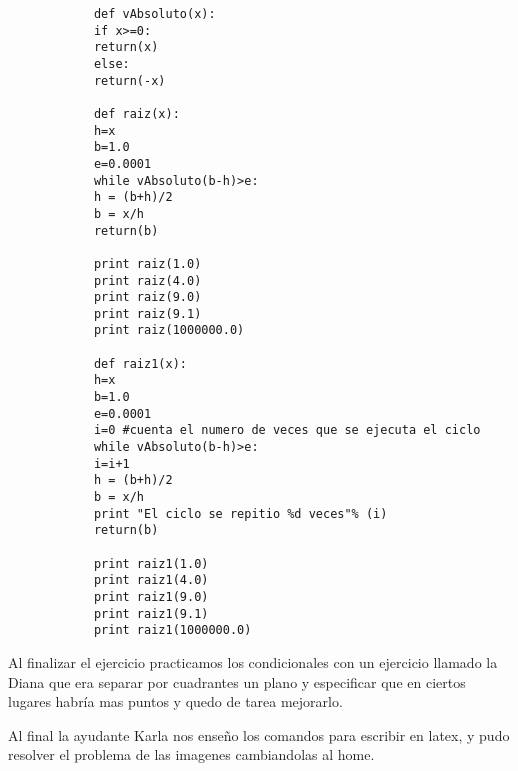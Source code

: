 \documentclass[letterpaper, 12pt, oneside]{article}
\begin{document}
\begin{enumerate}
\begin{enumerate}
			
			
			\newpage
			\begin{verbatim}
			def vAbsoluto(x):
			if x>=0:
			return(x)
			else:
			return(-x)
			
			def raiz(x):
			h=x
			b=1.0
			e=0.0001
			while vAbsoluto(b-h)>e:
			h = (b+h)/2
			b = x/h
			return(b)
			
			print raiz(1.0)
			print raiz(4.0)
			print raiz(9.0)
			print raiz(9.1)
			print raiz(1000000.0)
			
			def raiz1(x):
			h=x
			b=1.0
			e=0.0001
			i=0 #cuenta el numero de veces que se ejecuta el ciclo
			while vAbsoluto(b-h)>e:
			i=i+1
			h = (b+h)/2
			b = x/h
			print "El ciclo se repitio %d veces"% (i)
			return(b)
			
			print raiz1(1.0)
			print raiz1(4.0)
			print raiz1(9.0)
			print raiz1(9.1)
			print raiz1(1000000.0)
			\end{verbatim}
			
			\newpage
			
			Al finalizar el ejercicio practicamos los condicionales con un ejercicio llamado la Diana que era separar por cuadrantes un plano y especificar que en ciertos lugares habría mas puntos y quedo de tarea mejorarlo.
				
			Al final la ayudante Karla nos enseño los comandos para escribir en latex, y pudo resolver el problema de las imagenes cambiandolas al home.
		\end{enumerate}
	\end{enumerate}
\end{document}
